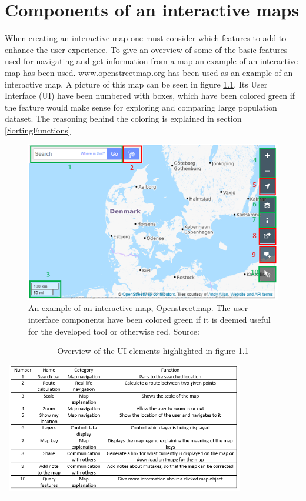 \chapter{Components of an interactive maps}
When creating an interactive map one must consider which features to add to enhance the user experience. To give an overview of some of the basic features used for navigating and get information from a map an example of an interactive map has been used. www.openstreetmap.org has been used as an example of an interactive map. \citep{OpenStreetMap} A picture of this map can be seen in figure \ref{InteractiveMap}. Its User Interface (UI) have been numbered with boxes, which have been colored green if the feature would make sense for exploring and comparing large population dataset. The reasoning behind the coloring is explained in section \ref{SortingFunctions}


\begin{figure} [H]
	\centering
	\includegraphics[width=.8\textwidth]{Pictures/InteractiveMap}
	\caption{An example of an interactive map, Openstreetmap. The user interface components have been colored green if it is deemed useful for the developed tool or otherwise red. Source: \citep{OpenStreetMap}}
	\label{InteractiveMap}
\end{figure}
\begin{table}[htbp]
	\centering
	\begin{tabular}{l}
		\includegraphics[width=0.8\textwidth]{Pictures/tabOSMFunctions}
	\end{tabular}
	\caption{Overview of the UI elements highlighted in figure \ref{InteractiveMap}}
	\label{tabOSMFunctions}
\end{table}

